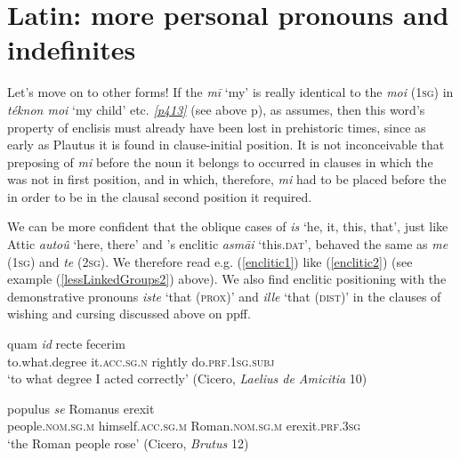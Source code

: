 \section{Latin: more personal pronouns and indefinites}

Let's move on to other forms! If the  \emph{mī} `my' is really identical to the \emph{moi} (\textsc{1sg}) in  \emph{téknon moi} `my child' etc. \hyperlink{p413}{\emph{[p413]}} (see above p\pageref{wilamowitz}), as \citet[819]{Brugmann1890} assumes, then this word's property of enclisis must already have been lost in prehistoric times, since as early as Plautus it is found in clause-initial position. It is not inconceivable that preposing of \emph{mi} before the noun it belongs to occurred in clauses in which the  was not in first position, and in which, therefore, \emph{mi} had to be placed before the  in order to be in the clausal second position it required.

We can be more confident that the oblique cases of \emph{is} `he, it, this, that', just like Attic \emph{autoû} `here, there' and 's enclitic \emph{asmāi} `this.\textsc{dat}', behaved the same as \emph{me} (\textsc{1sg}) and \emph{te} (\textsc{2sg}). We therefore read e.g. (\ref{enclitic1}) like (\ref{enclitic2}) (see example (\ref{lessLinkedGroups2}) above). We also find enclitic positioning with the demonstrative pronouns \emph{iste} `that (\textsc{prox})' and \emph{ille} `that (\textsc{dist})' in the clauses of wishing and cursing discussed above on pp\pageref{godformulae}ff.

\begin{exe}
\ex
\gll quam \emph{id} recte fecerim\\
to.what.degree it.\textsc{acc.sg.n} rightly do.\textsc{prf.1sg.subj}\\
\trans `to what degree I acted correctly' (Cicero, \textit{Laelius de Amicitia} 10) 
\label{enclitic1}
\end{exe}

\begin{exe}
\ex
\gll populus \emph{se} Romanus erexit\\
people.\textsc{nom.sg.m} himself.\textsc{acc.sg.m} Roman.\textsc{nom.sg.m} erexit.\textsc{prf.3sg}\\ 
\trans `the Roman people rose' (Cicero, \textit{Brutus} 12) 
\label{enclitic2}
\end{exe}


